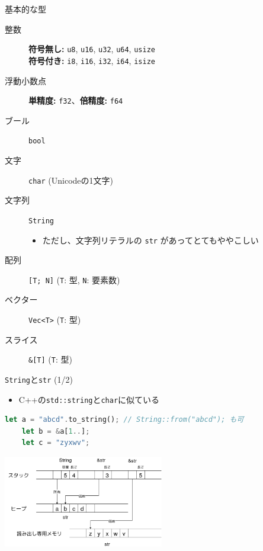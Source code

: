 \documentclass[cjk,dvipdfmx,10pt,compress,fragile%
hyperref={bookmarks=true,bookmarksnumbered=true,bookmarksopen=false,%
colorlinks=false,%
pdftitle={第 134 回 関西 Debian 勉強会},%
pdfauthor={小林},%
pdfsubject={資料},%
}]{beamer}
\begin{document}
\begin{frame}[t,fragile]{基本的な型}
 \begin{description}
  \item[整数]
	      \textbf{符号無し:} \texttt{u8}, \texttt{u16}, \texttt{u32}, \texttt{u64}, \texttt{usize}\\
	      \textbf{符号付き:} \texttt{i8}, \texttt{i16}, \texttt{i32}, \texttt{i64}, \texttt{isize}
  \item[浮動小数点] \textbf{単精度:} \texttt{f32}、\textbf{倍精度:} \texttt{f64}
  \item[ブール] \texttt{bool}
  \item[文字] \texttt{char}  (Unicodeの1文字)
  \item[文字列] \texttt{String}
	     \begin{itemize}
	      \item ただし、文字列リテラルの \texttt{str} があってとてもややこしい
	     \end{itemize}
  \item[配列] \texttt{[T; N]} (\texttt{T}: 型,  \texttt{N}: 要素数)
  \item[ベクター] \texttt{Vec<T>} (\texttt{T}: 型)
  \item[スライス] \texttt{\&[T]} (\texttt{T}: 型)
 \end{description}
\end{frame}

\begin{frame}[t,fragile]{\texttt{String}と\texttt{str} (1/2)}
\begin{itemize}
 \item C++の\texttt{std::string}と\texttt{char}に似ている
\end{itemize}
\begin{lstlisting}[language=Rust,style=boxed,style=colouredRust]
    let a = "abcd".to_string(); // String::from("abcd"); も可
    let b = &a[1..];
    let c = "zyxwv";\end{lstlisting}
\begin{center}
 \includegraphics[keepaspectratio,height=4cm]{./img/rustlang-str-string.png}
\end{center}
\end{frame}
\end{document}
